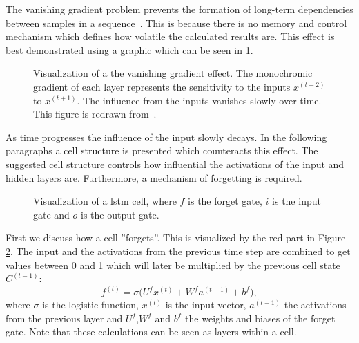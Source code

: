 The vanishing gradient problem prevents the formation of long-term dependencies between samples in a sequence~\cite[p.~38]{Graves2012}. 
This is because there is no memory and control mechanism which defines how volatile the calculated results are. 
This effect is best demonstrated using a graphic which can be seen in \ref{fig.vanishing-gradient}.
\begin{figure}[b]
	\centering
	
	\caption{Visualization of a the vanishing gradient effect. The monochromic gradient of each layer represents the sensitivity to the inputs $x^{(t-2)}$ to $x^{(t+1)}$. The influence from the inputs vanishes slowly over time. This figure is redrawn from~\cite[p.~38]{Graves2012}.}
	\label{fig.vanishing-gradient}
\end{figure}
As time progresses the influence of the input slowly decays. In the following paragraphs a cell structure is presented which counteracts this effect. The suggested cell structure controls how influential the activations of the input and hidden layers are. Furthermore, a mechanism of forgetting is required.

\begin{figure}
	\centering
	
	\caption{Visualization of a \gls{lstm} cell, where $f$ is the forget gate, $i$ is the input gate and  $o$ is the output gate.}
	\label{fig.lstm-cell}
\end{figure}

First we discuss how a cell ''forgets''. This is visualized by the red part in Figure \ref{fig.lstm-cell}. The input and the activations from the previous time step are combined to get values between 0 and 1 which will later be multiplied by the previous cell state $C^{(t-1)}$:
\begin{equation}
	f^{(t)}=\sigma\Big(U^f x^{(t)} + W^f a^{(t-1)} + b^f\Big),
\end{equation}
where $\sigma$ is the logistic function, $x^{(t)}$ is the input vector, $a^{(t-1)}$ the activations from the previous layer and $U^f$,$W^f$ and $b^f$ the weights and biases of the forget gate. Note that these calculations can be seen as layers within a cell.~\cite[p.~399]{Goodfellow2016}

